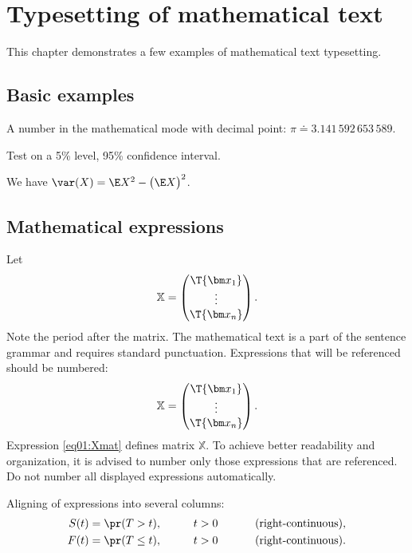 
\chapter{Typesetting of mathematical text}

This chapter demonstrates a few examples of mathematical text typesetting.

\section{Basic examples}


A number in the mathematical mode with decimal point: $\pi \doteq 3.141\,592\,653\,589$.

Test on a 5\% level, 95\% confidence interval.

We have $\var(X) = \E X^2 - \bigl(\E X \bigr)^2$.

\section{Mathematical expressions}
Let
\[
\mathbb{X} = \begin{pmatrix}
      \T{\bm x_1} \\
      \vdots \\
      \T{\bm x_n}
      \end{pmatrix}.
\]
Note the period after the matrix. The mathematical text is a part of
the sentence grammar and requires standard punctuation. Expressions
that will be referenced should be numbered:
\begin{equation}\label{eq01:Xmat}
\mathbb{X} = \begin{pmatrix}
      \T{\bm x_1} \\
      \vdots \\
      \T{\bm x_n}
      \end{pmatrix}.
\end{equation}
Expression \eqref{eq01:Xmat} defines matrix $\mathbb{X}$. To achieve
better readability and organization, it is advised to number only those
expressions that are referenced. Do not number all displayed
expressions automatically.

Aligning of expressions into several columns:
\begin{alignat*}{3}
S(t) &= \pr(T > t),    &\qquad t&>0       &\qquad&\text{ (right-continuous),}\\
F(t) &= \pr(T \leq t), &\qquad t&>0       &\qquad&\text{ (right-continuous).}
\end{alignat*}


